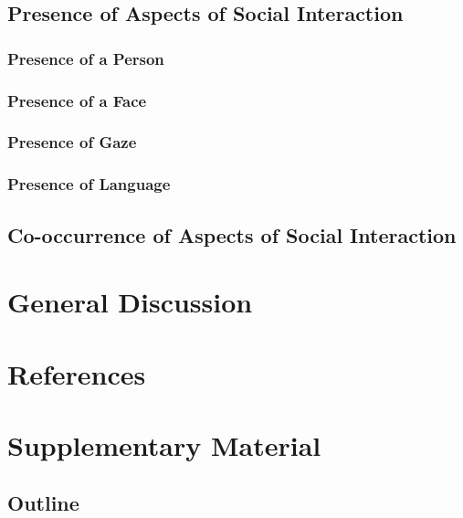 \documentclass[
  man,floatsintext]{apa6}
\begin{document}
\subsection{Presence of Aspects of Social Interaction}\label{presence-of-aspects-of-social-interaction}

\subsubsection{Presence of a Person}\label{presence-of-a-person}

\subsubsection{Presence of a Face}\label{presence-of-a-face}

\subsubsection{Presence of Gaze}\label{presence-of-gaze}

\subsubsection{Presence of Language}\label{presence-of-language}

\subsection{Co-occurrence of Aspects of Social Interaction}\label{co-occurrence-of-aspects-of-social-interaction}

\section{General Discussion}\label{general-discussion}

\newpage

\section{References}\label{references}

\newpage

\section{Supplementary Material}\label{supplementary-material}

\subsection{Outline}\label{outline}
\end{document}

